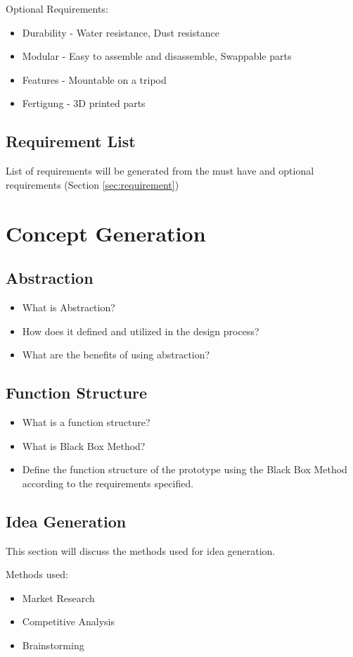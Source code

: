 Optional Requirements:
\begin{itemize}
    \item Durability - Water resistance, Dust resistance
    \item Modular - Easy to assemble and disassemble, Swappable parts
    \item Features - Mountable on a tripod
    \item Fertigung - 3D printed parts
\end{itemize}

\section{Requirement List}
List of requirements will be generated from the must have and optional requirements (Section \ref{sec:requirement})
\chapter{Concept Generation}
\section{Abstraction}
\begin{itemize}
    \item What is Abstraction?
    \item How does it defined and utilized in the design process?
    \item What are the benefits of using abstraction?
\end{itemize}
\section{Function Structure}
\begin{itemize}
    \item What is a function structure?
    \item What is Black Box Method?
    \item Define the function structure of the prototype using the Black Box Method according to the requirements specified.
\end{itemize}

\section{Idea Generation}
This section will discuss the methods used for idea generation.


Methods used:
\begin{itemize}
    \item Market Research
    \item Competitive Analysis
    \item Brainstorming
\end{itemize}


